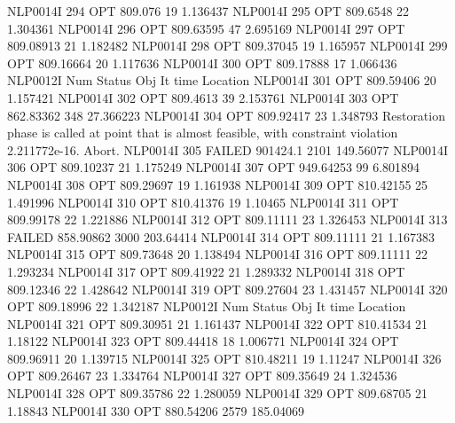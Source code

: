 NLP0014I           294         OPT 809.076       19 1.136437
NLP0014I           295         OPT 809.6548       22 1.304361
NLP0014I           296         OPT 809.63595       47 2.695169
NLP0014I           297         OPT 809.08913       21 1.182482
NLP0014I           298         OPT 809.37045       19 1.165957
NLP0014I           299         OPT 809.16664       20 1.117636
NLP0014I           300         OPT 809.17888       17 1.066436
NLP0012I 
              Num      Status      Obj             It       time                 Location
NLP0014I           301         OPT 809.59406       20 1.157421
NLP0014I           302         OPT 809.4613       39 2.153761
NLP0014I           303         OPT 862.83362      348 27.366223
NLP0014I           304         OPT 809.92417       23 1.348793
Restoration phase is called at point that is almost feasible,
  with constraint violation 2.211772e-16. Abort.
NLP0014I           305      FAILED 901424.1     2101 149.56077
NLP0014I           306         OPT 809.10237       21 1.175249
NLP0014I           307         OPT 949.64253       99 6.801894
NLP0014I           308         OPT 809.29697       19 1.161938
NLP0014I           309         OPT 810.42155       25 1.491996
NLP0014I           310         OPT 810.41376       19 1.10465
NLP0014I           311         OPT 809.99178       22 1.221886
NLP0014I           312         OPT 809.11111       23 1.326453
NLP0014I           313      FAILED 858.90862     3000 203.64414
NLP0014I           314         OPT 809.11111       21 1.167383
NLP0014I           315         OPT 809.73648       20 1.138494
NLP0014I           316         OPT 809.11111       22 1.293234
NLP0014I           317         OPT 809.41922       21 1.289332
NLP0014I           318         OPT 809.12346       22 1.428642
NLP0014I           319         OPT 809.27604       23 1.431457
NLP0014I           320         OPT 809.18996       22 1.342187
NLP0012I 
              Num      Status      Obj             It       time                 Location
NLP0014I           321         OPT 809.30951       21 1.161437
NLP0014I           322         OPT 810.41534       21 1.18122
NLP0014I           323         OPT 809.44418       18 1.006771
NLP0014I           324         OPT 809.96911       20 1.139715
NLP0014I           325         OPT 810.48211       19 1.11247
NLP0014I           326         OPT 809.26467       23 1.334764
NLP0014I           327         OPT 809.35649       24 1.324536
NLP0014I           328         OPT 809.35786       22 1.280059
NLP0014I           329         OPT 809.68705       21 1.18843
NLP0014I           330         OPT 880.54206     2579 185.04069
